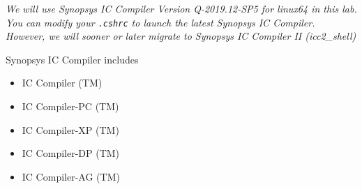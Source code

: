 \documentclass[a4paper,12pt,twoside]{article}
\begin{document}
\textit{We will use Synopsys IC Compiler Version Q-2019.12-SP5 for linux64 in this lab. You can modify your \texttt{.cshrc} to launch the latest Synopsys IC Compiler. However, we will sooner or later migrate to Synopsys IC Compiler II (icc2\_shell)}

Synopsys IC Compiler includes
\begin{itemize}
    \item IC Compiler (TM)
    \item IC Compiler-PC (TM)
    \item IC Compiler-XP (TM)
    \item IC Compiler-DP (TM)
    \item IC Compiler-AG (TM)
\end{itemize}
\end{document}

